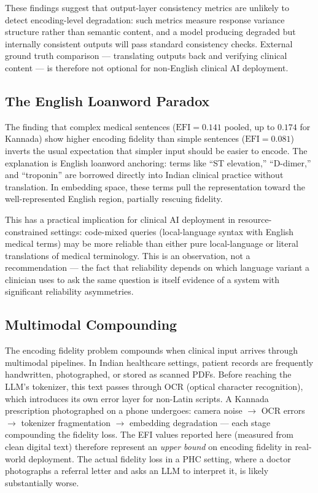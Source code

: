 \documentclass[11pt,a4paper]{article}
\begin{document}
These findings suggest that output-layer consistency metrics are unlikely to detect encoding-level degradation: such metrics measure response variance structure rather than semantic content, and a model producing degraded but internally consistent outputs will pass standard consistency checks. External ground truth comparison --- translating outputs back and verifying clinical content --- is therefore not optional for non-English clinical AI deployment.

\subsection{The English Loanword Paradox}

The finding that complex medical sentences ($\text{EFI} = 0.141$ pooled, up to $0.174$ for Kannada) show higher encoding fidelity than simple sentences ($\text{EFI} = 0.081$) inverts the usual expectation that simpler input should be easier to encode. The explanation is English loanword anchoring: terms like ``ST elevation,'' ``D-dimer,'' and ``troponin'' are borrowed directly into Indian clinical practice without translation. In embedding space, these terms pull the representation toward the well-represented English region, partially rescuing fidelity.

This has a practical implication for clinical AI deployment in resource-constrained settings: code-mixed queries (local-language syntax with English medical terms) may be more reliable than either pure local-language or literal translations of medical terminology. This is an observation, not a recommendation --- the fact that reliability depends on which language variant a clinician uses to ask the same question is itself evidence of a system with significant reliability asymmetries.

\subsection{Multimodal Compounding}

The encoding fidelity problem compounds when clinical input arrives through multimodal pipelines. In Indian healthcare settings, patient records are frequently handwritten, photographed, or stored as scanned PDFs. Before reaching the LLM's tokenizer, this text passes through OCR (optical character recognition), which introduces its own error layer for non-Latin scripts. A Kannada prescription photographed on a phone undergoes: camera noise $\to$ OCR errors $\to$ tokenizer fragmentation $\to$ embedding degradation --- each stage compounding the fidelity loss. The EFI values reported here (measured from clean digital text) therefore represent an \emph{upper bound} on encoding fidelity in real-world deployment. The actual fidelity loss in a PHC setting, where a doctor photographs a referral letter and asks an LLM to interpret it, is likely substantially worse.
\end{document}

